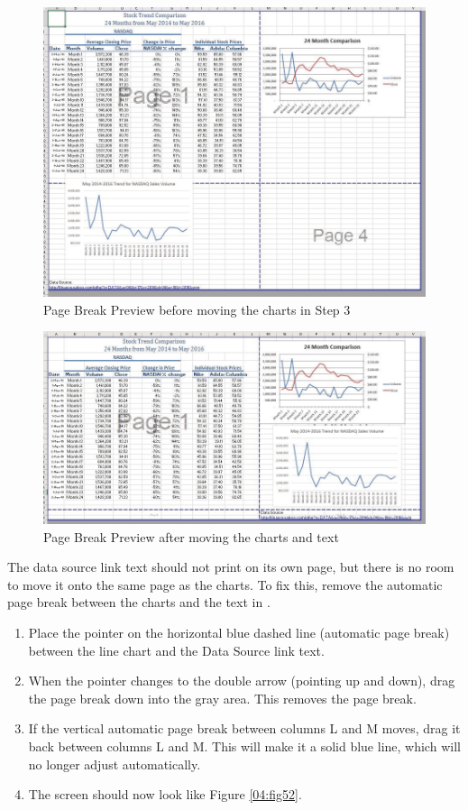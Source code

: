 \begin{figure}[H]
	\centering
	\includegraphics[width=\maxwidth{.95\linewidth}]{gfx/ch04_fig50}
	\caption{Page Break Preview before moving the charts in Step 3}
	\label{04:fig50}
\end{figure}

\begin{figure}[H]
	\centering
	\includegraphics[width=\maxwidth{.95\linewidth}]{gfx/ch04_fig51}
	\caption{Page Break Preview after moving the charts and text}
	\label{04:fig51}
\end{figure}

The data source link text should not print on its own page, but there is no room to move it onto the same page as the charts. To fix this, remove the automatic page break between the charts and the text in .

\begin{enumerate}
	\item Place the pointer on the horizontal blue dashed line (automatic page break) between the line chart and the Data Source link text.
	\item When the pointer changes to the double arrow (pointing up and down), drag the page break down into the gray area. This removes the page break.
	\item If the vertical automatic page break between columns L and M moves, drag it back between columns L and M. This will make it a solid blue line, which will no longer adjust automatically.
	\item The screen should now look like Figure \ref{04:fig52}.
\end{enumerate}


